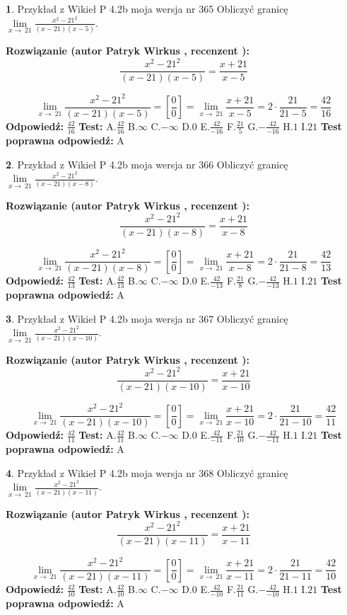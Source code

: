 \documentclass[12pt, a4paper]{article}
\theoremstyle{definition} %
\newtheorem{zad}{}
\newcommand{\zadStart}[1]{\begin{zad}#1\newline}
\newcommand{\zadStop}{\end{zad}}
\newcommand{\rozwStart}[2]{\noindent \textbf{Rozwiązanie (autor #1 , recenzent #2): }\newline}
\newcommand{\rozwStop}{\newline}
\newcommand{\odpStart}{\noindent \textbf{Odpowiedź:}\newline}
\newcommand{\odpStop}{\newline}
\newcommand{\testStart}{\noindent \textbf{Test:}\newline}
\newcommand{\testStop}{\newline}
\newcommand{\kluczStart}{\noindent \textbf{Test poprawna odpowiedź:}\newline}
\newcommand{\kluczStop}{\newline}
\begin{document}
\zadStart{Przykład z Wikieł P 4.2b moja wersja nr 365}
Obliczyć granicę $\lim\limits_{x\to\ 21}\frac{x^{2}-21^{2}}{(x-21)(x-5)}$.
\zadStop
\rozwStart{Patryk Wirkus}{}
$$\frac{x^{2}-21^{2}}{(x-21)(x-5)}=\frac{x+21}{x-5}$$

$$\lim\limits_{x\to\ 21}\frac{x^{2}-21^{2}}{(x-21)(x-5)}=[\frac{0}{0}]=\lim\limits_{x\to\ 21}\frac{x+21}{x-5}=2 \cdot \frac{21}{21-5} = \frac{42}{16}$$
\rozwStop
\odpStart
$\frac{42}{16}$
\odpStop
\testStart
A.$\frac{42}{16}$
B.$\infty$
C.$-\infty$
D.$0$
E.$\frac{42}{-16}$
F.$\frac{21}{5}$
G.$-\frac{42}{-16}$
H.$1$
I.$21$
\testStop
\kluczStart
A
\kluczStop



\zadStart{Przykład z Wikieł P 4.2b moja wersja nr 366}
Obliczyć granicę $\lim\limits_{x\to\ 21}\frac{x^{2}-21^{2}}{(x-21)(x-8)}$.
\zadStop
\rozwStart{Patryk Wirkus}{}
$$\frac{x^{2}-21^{2}}{(x-21)(x-8)}=\frac{x+21}{x-8}$$

$$\lim\limits_{x\to\ 21}\frac{x^{2}-21^{2}}{(x-21)(x-8)}=[\frac{0}{0}]=\lim\limits_{x\to\ 21}\frac{x+21}{x-8}=2 \cdot \frac{21}{21-8} = \frac{42}{13}$$
\rozwStop
\odpStart
$\frac{42}{13}$
\odpStop
\testStart
A.$\frac{42}{13}$
B.$\infty$
C.$-\infty$
D.$0$
E.$\frac{42}{-13}$
F.$\frac{21}{8}$
G.$-\frac{42}{-13}$
H.$1$
I.$21$
\testStop
\kluczStart
A
\kluczStop



\zadStart{Przykład z Wikieł P 4.2b moja wersja nr 367}
Obliczyć granicę $\lim\limits_{x\to\ 21}\frac{x^{2}-21^{2}}{(x-21)(x-10)}$.
\zadStop
\rozwStart{Patryk Wirkus}{}
$$\frac{x^{2}-21^{2}}{(x-21)(x-10)}=\frac{x+21}{x-10}$$

$$\lim\limits_{x\to\ 21}\frac{x^{2}-21^{2}}{(x-21)(x-10)}=[\frac{0}{0}]=\lim\limits_{x\to\ 21}\frac{x+21}{x-10}=2 \cdot \frac{21}{21-10} = \frac{42}{11}$$
\rozwStop
\odpStart
$\frac{42}{11}$
\odpStop
\testStart
A.$\frac{42}{11}$
B.$\infty$
C.$-\infty$
D.$0$
E.$\frac{42}{-11}$
F.$\frac{21}{10}$
G.$-\frac{42}{-11}$
H.$1$
I.$21$
\testStop
\kluczStart
A
\kluczStop



\zadStart{Przykład z Wikieł P 4.2b moja wersja nr 368}
Obliczyć granicę $\lim\limits_{x\to\ 21}\frac{x^{2}-21^{2}}{(x-21)(x-11)}$.
\zadStop
\rozwStart{Patryk Wirkus}{}
$$\frac{x^{2}-21^{2}}{(x-21)(x-11)}=\frac{x+21}{x-11}$$

$$\lim\limits_{x\to\ 21}\frac{x^{2}-21^{2}}{(x-21)(x-11)}=[\frac{0}{0}]=\lim\limits_{x\to\ 21}\frac{x+21}{x-11}=2 \cdot \frac{21}{21-11} = \frac{42}{10}$$
\rozwStop
\odpStart
$\frac{42}{10}$
\odpStop
\testStart
A.$\frac{42}{10}$
B.$\infty$
C.$-\infty$
D.$0$
E.$\frac{42}{-10}$
F.$\frac{21}{11}$
G.$-\frac{42}{-10}$
H.$1$
I.$21$
\testStop
\kluczStart
A
\kluczStop
\end{document}

